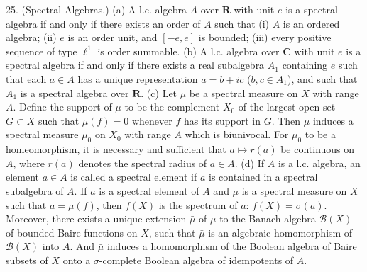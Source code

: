 25. (Spectral Algebras.)
(a) A l.c. algebra $A$ over $\mathbf{R}$ with unit $e$ is a spectral algebra if and only if there exists an order of $A$ such that (i) $A$ is an ordered algebra; (ii) $e$ is an order unit, and $[-e, e]$ is bounded; (iii) every positive sequence of type $\ell^1$ is order summable.
(b) A l.c. algebra over $\mathbf{C}$ with unit $e$ is a spectral algebra if and only if there exists a real subalgebra $A_1$ containing $e$ such that each $a \in A$ has a unique representation $a = b + ic$ ($b, c \in A_1$), and such that $A_1$ is a spectral algebra over $\mathbf{R}$.
(c) Let $\mu$ be a spectral measure on $X$ with range $A$. Define the support of $\mu$ to be the complement $X_0$ of the largest open set $G \subset X$ such that $\mu(f) = 0$ whenever $f$ has its support in $G$. Then $\mu$ induces a spectral measure $\mu_0$ on $X_0$ with range $A$ which is biunivocal. For $\mu_0$ to be a homeomorphism, it is necessary and sufficient that $a \mapsto r(a)$ be continuous on $A$, where $r(a)$ denotes the spectral radius of $a \in A$.
(d) If $A$ is a l.c. algebra, an element $a \in A$ is called a spectral element if $a$ is contained in a spectral subalgebra of $A$. If $a$ is a spectral element of $A$ and $\mu$ is a spectral measure on $X$ such that $a = \mu(f)$, then $f(X)$ is the spectrum of $a$: $f(X) = \sigma(a)$.
Moreover, there exists a unique extension $\bar{\mu}$ of $\mu$ to the Banach algebra $\mathcal{B}(X)$ of bounded Baire functions on $X$, such that $\bar{\mu}$ is an algebraic homomorphism of $\mathcal{B}(X)$ into $A$. And $\bar{\mu}$ induces a homomorphism of the Boolean algebra of Baire subsets of $X$ onto a $\sigma$-complete Boolean algebra of idempotents of $A$.
